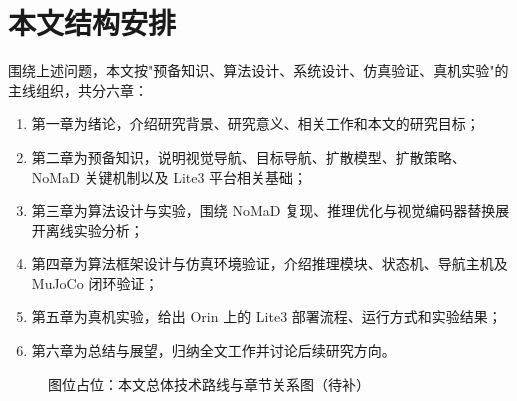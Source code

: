 \section{本文结构安排}

围绕上述问题，本文按"预备知识、算法设计、系统设计、仿真验证、真机实验"的主线组织，共分六章：

\begin{enumerate}
    \item 第一章为绪论，介绍研究背景、研究意义、相关工作和本文的研究目标；
    \item 第二章为预备知识，说明视觉导航、目标导航、扩散模型、扩散策略、NoMaD 关键机制以及 Lite3 平台相关基础；
    \item 第三章为算法设计与实验，围绕 NoMaD 复现、推理优化与视觉编码器替换展开离线实验分析；
    \item 第四章为算法框架设计与仿真环境验证，介绍推理模块、状态机、导航主机及 MuJoCo 闭环验证；
    \item 第五章为真机实验，给出 Orin 上的 Lite3 部署流程、运行方式和实验结果；
    \item 第六章为总结与展望，归纳全文工作并讨论后续研究方向。
\end{enumerate}

\begin{figure}[htbp]
    \centering
    \fbox{\rule{0pt}{55mm}\rule{0.86\linewidth}{0pt}}
    \caption{图位占位：本文总体技术路线与章节关系图（待补）}
    \label{fig:intro-roadmap-placeholder}
\end{figure}
